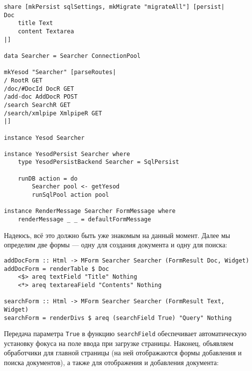 \begin{lstlisting}
share [mkPersist sqlSettings, mkMigrate "migrateAll"] [persist|
Doc
    title Text
    content Textarea
|]

data Searcher = Searcher ConnectionPool

mkYesod "Searcher" [parseRoutes|
/ RootR GET
/doc/#DocId DocR GET
/add-doc AddDocR POST
/search SearchR GET
/search/xmlpipe XmlpipeR GET
|]

instance Yesod Searcher

instance YesodPersist Searcher where
    type YesodPersistBackend Searcher = SqlPersist

    runDB action = do
        Searcher pool <- getYesod
        runSqlPool action pool

instance RenderMessage Searcher FormMessage where
    renderMessage _ _ = defaultFormMessage
\end{lstlisting}

Надеюсь, всё это должно быть уже знакомым на данный момент. Далее мы определим две формы --- одну для создания документа и одну для поиска:

\begin{lstlisting}
addDocForm :: Html -> MForm Searcher Searcher (FormResult Doc, Widget)
addDocForm = renderTable $ Doc
    <$> areq textField "Title" Nothing
    <*> areq textareaField "Contents" Nothing

searchForm :: Html -> MForm Searcher Searcher (FormResult Text, Widget)
searchForm = renderDivs $ areq (searchField True) "Query" Nothing
\end{lstlisting}%

Передача параметра \lstinline'True' в функцию \lstinline'searchField' обеспечивает автоматическую установку фокуса на поле ввода при загрузке страницы. Наконец, объявляем обработчики для главной страницы (на ней отображаются формы добавления и поиска документов), а также для отображения и добавления документа:

